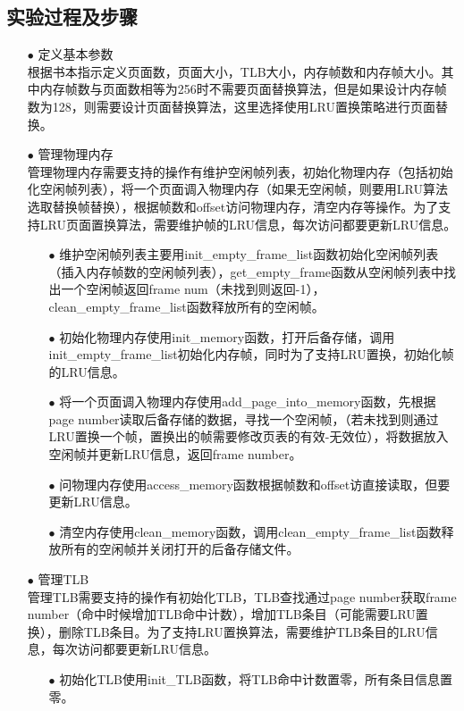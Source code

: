 \documentclass{article}
\begin{document}
\subsection{实验过程及步骤}
\begin{itemize}
\item[$\bullet$]定义基本参数\\
根据书本指示定义页面数，页面大小，TLB大小，内存帧数和内存帧大小。其中内存帧数与页面数相等为256时不需要页面替换算法，但是如果设计内存帧数为128，则需要设计页面替换算法，这里选择使用LRU置换策略进行页面替换。
\item[$\bullet$]管理物理内存\\
管理物理内存需要支持的操作有维护空闲帧列表，初始化物理内存（包括初始化空闲帧列表），将一个页面调入物理内存（如果无空闲帧，则要用LRU算法选取替换帧替换），根据帧数和offset访问物理内存，清空内存等操作。为了支持LRU页面置换算法，需要维护帧的LRU信息，每次访问都要更新LRU信息。
\begin{itemize}
\item[$\bullet$]维护空闲帧列表主要用init\_empty\_frame\_list函数初始化空闲帧列表（插入内存帧数的空闲帧列表），get\_empty\_frame函数从空闲帧列表中找出一个空闲帧返回frame num（未找到则返回-1），clean\_empty\_frame\_list函数释放所有的空闲帧。
\item[$\bullet$]初始化物理内存使用init\_memory函数，打开后备存储，调用init\_empty\_frame\_list初始化内存帧，同时为了支持LRU置换，初始化帧的LRU信息。
\item[$\bullet$]将一个页面调入物理内存使用add\_page\_into\_memory函数，先根据page number读取后备存储的数据，寻找一个空闲帧，（若未找到则通过LRU置换一个帧，置换出的帧需要修改页表的有效-无效位），将数据放入空闲帧并更新LRU信息，返回frame number。
\item[$\bullet$]问物理内存使用access\_memory函数根据帧数和offset访直接读取，但要更新LRU信息。
\item[$\bullet$]清空内存使用clean\_memory函数，调用clean\_empty\_frame\_list函数释放所有的空闲帧并关闭打开的后备存储文件。
\end{itemize}
\item[$\bullet$]管理TLB\\
管理TLB需要支持的操作有初始化TLB，TLB查找通过page number获取frame number（命中时候增加TLB命中计数），增加TLB条目（可能需要LRU置换），删除TLB条目。为了支持LRU置换算法，需要维护TLB条目的LRU信息，每次访问都要更新LRU信息。
\begin{itemize}
\item[$\bullet$]初始化TLB使用init\_TLB函数，将TLB命中计数置零，所有条目信息置零。

\end{itemize}
\end{itemize}
\end{document}
